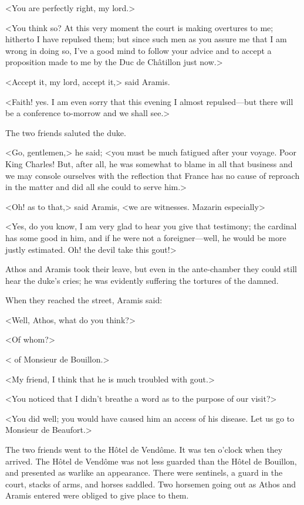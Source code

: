 <You are perfectly right, my lord.>

<You think so? At this very moment the court is making overtures to me; hitherto I have repulsed them; but since such men as you assure me that I am wrong in doing so, I've a good mind to follow your advice and to accept a proposition made to me by the Duc de Châtillon just now.>

<Accept it, my lord, accept it,> said Aramis.

<Faith! yes. I am even sorry that this evening I almost repulsed—but there will be a conference to-morrow and we shall see.>

The two friends saluted the duke.

<Go, gentlemen,> he said; <you must be much fatigued after your voyage. Poor King Charles! But, after all, he was somewhat to blame in all that business and we may console ourselves with the reflection that France has no cause of reproach in the matter and did all she could to serve him.>

<Oh! as to that,> said Aramis, <we are witnesses. Mazarin especially\longdash>

<Yes, do you know, I am very glad to hear you give that testimony; the cardinal has some good in him, and if he were not a foreigner—well, he would be more justly estimated. Oh! the devil take this gout!>

Athos and Aramis took their leave, but even in the ante-chamber they could still hear the duke's cries; he was evidently suffering the tortures of the damned.

When they reached the street, Aramis said:

<Well, Athos, what do you think?>

<Of whom?>

< of Monsieur de Bouillon.>

<My friend, I think that he is much troubled with gout.>

<You noticed that I didn't breathe a word as to the purpose of our visit?>

<You did well; you would have caused him an access of his disease. Let us go to Monsieur de Beaufort.>

The two friends went to the Hôtel de Vendôme. It was ten o'clock when they arrived. The Hôtel de Vendôme was not less guarded than the Hôtel de Bouillon, and presented as warlike an appearance. There were sentinels, a guard in the court, stacks of arms, and horses saddled. Two horsemen going out as Athos and Aramis entered were obliged to give place to them.

